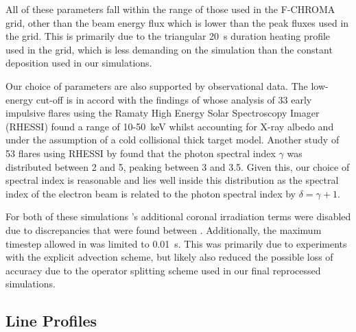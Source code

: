 All of these parameters fall within the range of those used in the F-CHROMA grid, other than the beam energy flux which is lower than the peak fluxes used in the grid.
This is primarily due to the triangular \SI{20}{\second} duration heating profile used in the grid, which is less demanding on the simulation than the constant deposition used in our simulations.

Our choice of parameters are also supported by observational data.
The low-energy cut-off is in accord with the findings of \citet{Sui2007} whose analysis of 33 early impulsive flares using the Ramaty High Energy Solar Spectroscopy Imager (RHESSI) found a range of 10-\SI{50}{\kilo\electronvolt} whilst accounting for X-ray albedo and under the assumption of a cold collisional thick target model.
Another study of 53 flares using RHESSI by \citet{Saint-Hilaire2008} found that the photon spectral index $\gamma$ was distributed between 2 and 5, peaking between 3 and 3.5.
Given this, our choice of spectral index is reasonable and lies well inside this distribution as the spectral index of the electron beam is related to the photon spectral index by $\delta = \gamma + 1$.

For both of these simulations \Radyn{}'s additional coronal  irradiation terms were disabled due to discrepancies that were found between  \Lw{}.
Additionally, the maximum timestep allowed in \Radyn{} was limited to \SI{0.01}{\second}.
This was primarily due to experiments with the explicit advection scheme, but likely also reduced the possible loss of accuracy due to the operator splitting scheme used in our final reprocessed simulations.

\subsection{Line Profiles}\label{Sec:TimeDep8542Profiles}

